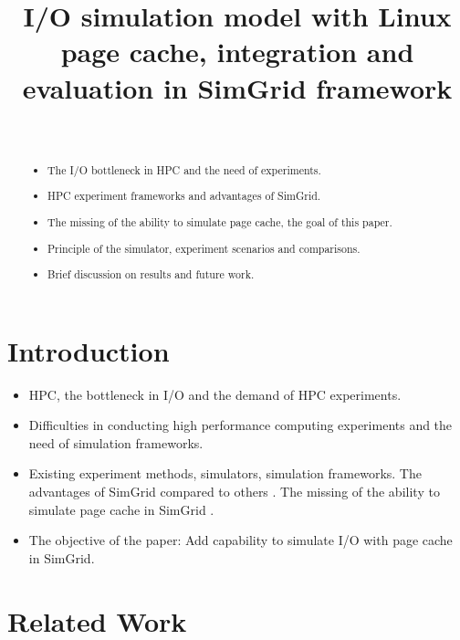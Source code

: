 \documentclass[conference]{IEEEtran}
\begin{document}
\title{I/O simulation model with Linux page cache, integration and evaluation in SimGrid framework}

\author{\\
}

\maketitle

	\begin{abstract}
		\begin{itemize}
			\item The I/O bottleneck in HPC and the need of experiments.
			\item HPC experiment frameworks and advantages of SimGrid.
			\item The missing of the ability to simulate page cache, the goal of this paper.
			\item Principle of the simulator, experiment scenarios and comparisons.
			\item Brief discussion on results and future work.
		\end{itemize}
	\end{abstract}

	\section{Introduction}
		\begin{itemize}
			\item HPC, the bottleneck in I/O and the demand of HPC experiments. 
			\item Difficulties in conducting high performance computing experiments and the need of simulation frameworks.
			\item Existing experiment methods, simulators, simulation frameworks. The advantages of SimGrid compared to others \cite{casanova2008, lebre2015}. The missing of the ability to simulate page cache in SimGrid \cite{lebre2015}.
			\item The objective of the paper: Add capability to simulate I/O with page cache in SimGrid.
		\end{itemize}
	\section{Related Work}			
		
\end{document}
